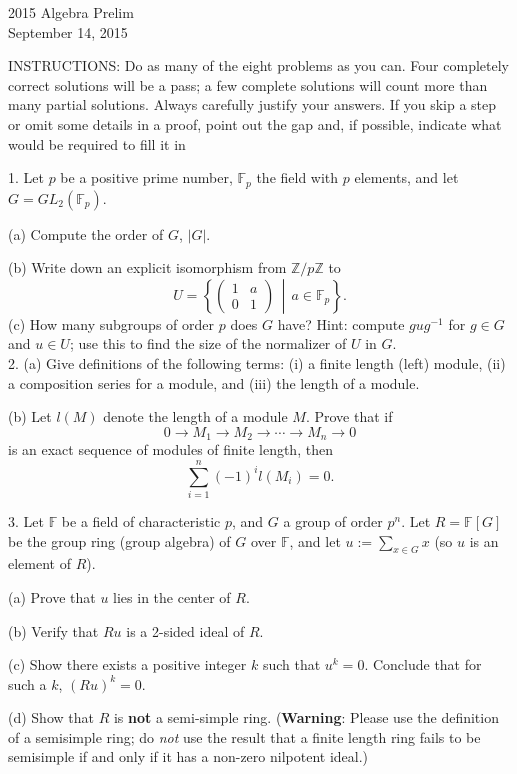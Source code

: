 \documentclass[11pt]{article}
\newcommand{\Z}{\mathbb{Z}}
\newcommand{\F}{\mathbb{F}}
\begin{document}
\begin{center}
\Large 2015 Algebra Prelim\\
\normalsize September 14, 2015
\end{center}
\vspace{1em}

INSTRUCTIONS: Do as many of the eight problems as you can. Four completely
correct solutions will be a pass; a few complete solutions will count more than many
partial solutions. Always carefully justify your answers. If you skip a step or omit
some details in a proof, point out the gap and, if possible, indicate what would be
required to fill it in\\
\vspace{1em}

1. Let $p$ be a positive prime number, $\F_p$ the field with $p$ elements, and let $G = GL_2(\F_p)$.

(a) Compute the order of $G$, $|G|$.

(b) Write down an explicit isomorphism from $\Z/p\Z$ to\[
U = \left\{ \begin{pmatrix}1&a\\0&1\end{pmatrix}\,\middle| \, a\in \F_p\right\}.
\]
(c) How many subgroups of order $p$ does $G$ have?
Hint: compute $gug^{−1}$
for $g \in G$ and $u\in U$; use this to find the size of the
normalizer of $U$ in $G$.\\

2. (a) Give definitions of the following terms: (i) a finite length (left) module, (ii) a
composition series for a module, and (iii) the length of a module.


(b) Let $l(M)$ denote the length of a module $M$. Prove that if\[
0 \to M_1\to M_2\to \cdots \to M_n\to 0
\]
is an exact sequence of modules of finite length, then\[
\sum_{i=1}^n(-1)^il(M_i) = 0.
\]

3. Let $\F$ be a field of characteristic $p$, and $G$ a group of order $p^n$. Let $R = \F[G]$ be the
group ring (group algebra) of $G$ over $\F$, and let $u := \sum_{x\in G} x$ (so $u$ is an element of $R$).

(a) Prove that $u$ lies in the center of $R$.

(b) Verify that $Ru$ is a 2-sided ideal of $R$.

(c) Show there exists a positive integer $k$ such that $u^k = 0$. Conclude that for such a $k$, $(Ru)^k = 0$.


(d) Show that $R$ is \textbf{not} a semi-simple ring. (\textbf{Warning}: Please use the definition
of a semisimple ring; do \emph{not} use the result that a finite length ring fails to be
semisimple if and only if it has a non-zero nilpotent ideal.)\\
\end{document}
